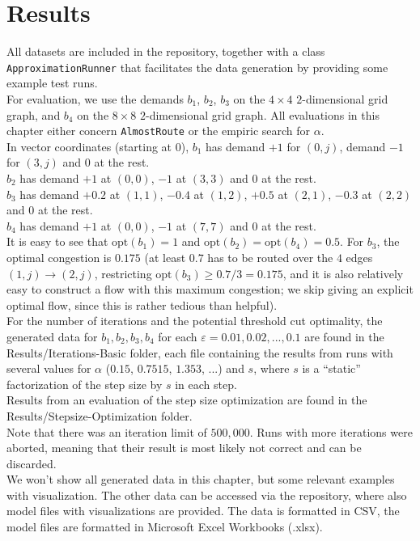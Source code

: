 \chapter{Results}
All datasets are included in the repository, together with a class \texttt{ApproximationRunner} that facilitates the data generation by providing some example test runs.\\

For evaluation, we use the demands $b_1$, $b_2$, $b_3$ on the $4\times 4$ $2$-dimensional grid graph, and $b_4$ on the $8\times 8$ $2$-dimensional grid graph. All evaluations in this chapter either concern \texttt{AlmostRoute} or the empiric search for $\alpha$.\\
In vector coordinates (starting at $0$), $b_1$ has demand $+1$ for $(0,j)$, demand $-1$ for $(3,j)$ and $0$ at the rest.\\
$b_2$ has demand $+1$ at $(0,0)$, $-1$ at $(3,3)$ and $0$ at the rest.\\
$b_3$ has demand $+0.2$ at $(1,1)$, $-0.4$ at $(1,2)$, $+0.5$ at $(2,1)$, $-0.3$ at $(2,2)$ and $0$ at the rest.\\
$b_4$ has demand $+1$ at $(0,0)$, $-1$ at $(7,7)$ and $0$ at the rest.\\
It is easy to see that $\text{opt}(b_1)=1$ and $\text{opt}(b_2)=\text{opt}(b_4)=0.5$. For $b_3$, the optimal congestion is $0.175$ (at least $0.7$ has to be routed over the $4$ edges $(1,j)\rightarrow (2,j)$, restricting $\text{opt}(b_3)\geq 0.7/3=0.175$, and it is also relatively easy to construct a flow with this maximum congestion; we skip giving an explicit optimal flow, since this is rather tedious than helpful).\\
For the number of iterations and the potential threshold cut optimality, the generated data for $b_1,b_2,b_3,b_4$ for each $\varepsilon=0.01,0.02,...,0.1$ are found in the Results/Iterations-Basic folder, each file containing the results from runs with several values for $\alpha$ ($0.15$, $0.7515$, $1.353$, ...) and $s$, where $s$ is a ``static'' factorization of the step size by $s$ in each step.\\
Results from an evaluation of the step size optimization are found in the Results/Stepsize-Optimization folder.\\
Note that there was an iteration limit of $500,000$. Runs with more iterations were aborted, meaning that their result is most likely not correct and can be discarded.\\
We won't show all generated data in this chapter, but some relevant examples with visualization. The other data can be accessed via the repository, where also model files with visualizations are provided. The data is formatted in CSV, the model files are formatted in Microsoft Excel Workbooks (.xlsx).

